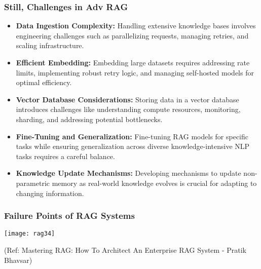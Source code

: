 \begin{frame}[fragile]\frametitle{Still, Challenges in Adv RAG}
  \begin{itemize}
    \item \textbf{Data Ingestion Complexity:} Handling extensive knowledge bases involves engineering challenges such as parallelizing requests, managing retries, and scaling infrastructure.
    \item \textbf{Efficient Embedding:} Embedding large datasets requires addressing rate limits, implementing robust retry logic, and managing self-hosted models for optimal efficiency.
    \item \textbf{Vector Database Considerations:} Storing data in a vector database introduces challenges like understanding compute resources, monitoring, sharding, and addressing potential bottlenecks.
    \item \textbf{Fine-Tuning and Generalization:} Fine-tuning RAG models for specific tasks while ensuring generalization across diverse knowledge-intensive NLP tasks requires a careful balance.
    \item \textbf{Knowledge Update Mechanisms:} Developing mechanisms to update non-parametric memory as real-world knowledge evolves is crucial for adapting to changing information.
  \end{itemize}
\end{frame}



\begin{frame}[fragile]\frametitle{Failure Points of RAG Systems}


		\begin{center}
		\texttt{[image: rag34]}
		\end{center}

{\tiny (Ref: Mastering RAG: How To Architect An Enterprise RAG System - Pratik Bhavsar)}

\end{frame}

